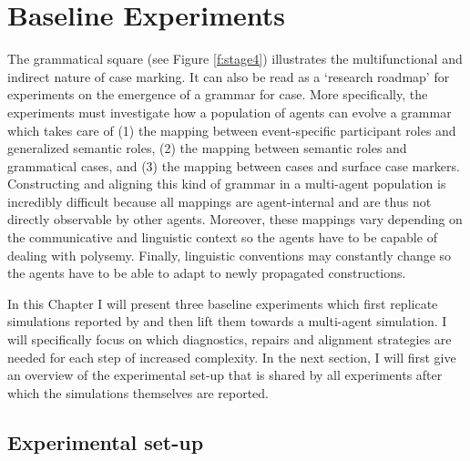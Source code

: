 
\setcounter{chapter}{2}
\chapter{Baseline Experiments}
\label{c:base}

The grammatical square (see Figure \ref{f:stage4}) illustrates the multifunctional and indirect nature of case marking. It can also be read as a `research roadmap' for experiments on the emergence of a grammar for case. More specifically, the experiments must investigate how a population of agents can evolve a grammar which takes care of (1) the mapping between event-specific participant roles and generalized semantic roles, (2) the mapping between semantic roles and grammatical cases, and (3) the mapping between cases and surface case markers. Constructing and aligning this kind of grammar in a multi-agent population is incredibly difficult because all mappings are agent-internal and are thus not directly observable by other agents. Moreover, these mappings vary depending on the communicative and linguistic context so the agents have to be capable of dealing with polysemy. Finally, linguistic conventions may constantly change so the agents have to be able to adapt to newly propagated constructions.

In this Chapter I will present three baseline experiments which first replicate simulations reported by \citet{steels02simulating, steels04constructivist} and then lift them towards a multi-agent simulation. I will specifically focus on which diagnostics, repairs and alignment strategies are needed for each step of increased complexity. In the next section, I will first give an overview of the experimental set-up that is shared by all experiments after which the simulations themselves are reported.

\section{Experimental set-up}


